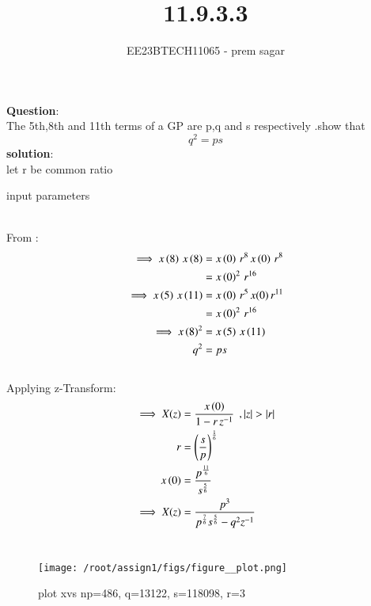 \documentclass[journal,12pt,twocolumn]{IEEEtran}
\theoremstyle{remark}
\begin{document}

\vspace{3cm}

\title{11.9.3.3}
\author{EE23BTECH11065 - prem sagar}
\maketitle
\newpage

\bigskip 

\renewcommand{\thefigure}{\theenumi}
\renewcommand{\thetable}{\theenumi}
\textbf{Question}:\\ The 5th,8th and 11th terms of a GP are p,q and s respectively .show that \[q^2=ps\]
\textbf{solution}:
\\let r be common ratio
\begin{table}[!ht]
   \centering
    \renewcommand\thetable{1}
      
    \caption{input parameters}
    \label{tab:11.9.3}
 \end{table}
\\ From :
\begin{align}
\implies x\left(8\right)\,x\left(8\right)&=x\left(0\right)\,r^8\,x\left(0\right)\,r^8
     \\ &=x\left(0\right)^2\,r^{16}
\\\implies x\left(5\right)\,x\left({11}\right)&=x\left(0\right)\,r^5\,x(0)\,r^{11}
       \\&=x\left(0\right)^2\,r^{16}
\\\implies x\left(8\right)^2&=x\left(5\right)\,x\left({11}\right)
\\q^2&=ps
\end{align}
\\Applying z-Transform:
\\\begin{align}
 \implies    X(z) &= \frac{x\brak{0}}{1-r\,z^{-1}}\: \:,|z|>|r|
              \\r&=\brak{\frac{s}{p}}^\frac{1}{6}
      \\x\brak{0}&=\frac{p^\frac{11}{6}}{s^\frac{5}{6}}
 \\\implies  X(z)&=\frac{p^3}{p^\frac{7}{6}s^\frac{5}{6}-q^2z^{-1}}
     \end{align}    
\\\begin{figure}[h]
   \renewcommand\thefigure{1}
    \centering
    \texttt{[image: /root/assign1/figs/figure\_\_plot.png]}
    \caption{plot xvs n\hspace{0.1cm}p=486,
    \hspace{0.1cm}q=13122,
    \hspace{0.1cm}s=118098,
    \hspace{0.1cm}r=3}
    \label{fig:1}
\end{figure}\\
\end{document}
